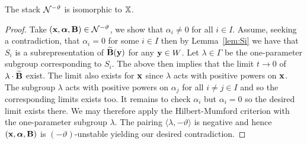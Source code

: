 \documentclass{amsart}
\newcommand{\balpha}{\boldsymbol{\alpha}}
\theoremstyle{definition}
\begin{document}



\begin{corollary}
The stack $\mathcal{N}^{-\vartheta}$ is isomorphic to $\mathbb{X}$.
\end{corollary}

\begin{proof}
Take $(\bfx, \balpha, \bfB) \in \cN^{-\vartheta}$, we show that $\alpha_i \neq 0$ for all $i \in I$.
Assume, seeking a contradiction, that $\alpha_i =0$ for some $i \in I$ then by Lemma~\ref{lem:Si} we have that $S_i$ is a subrepresentation of $\widetilde{\mathbf{B}}(\mathbf{y})$ for any $\mathbf{y} \in W$.
Let $\lambda \in \Gamma$ be the one-parameter subgroup corresponding to $S_i$.
The above then implies that the limit $t \rightarrow 0$ of $\lambda \cdot \widetilde{\mathbf{B}}$ exist.
The limit also exists for $\mathbf{x}$ since $\lambda$ acts with positive powers on $\mathbf{x}$.
The subgroup $\lambda$ acts with positive powers on $\alpha_j$ for all $i\neq j\in I$ and so the corresponding limits exists too.
It remains to check $\alpha_i$ but $\alpha_i=0$ so the desired limit exists there.
We may therefore apply the Hilbert-Mumford criterion with the one-parameter subgroup $\lambda$.
The pairing $\langle \lambda, -\vartheta \rangle$ is negative and hence $(\bfx, \balpha, \bfB)$ is $(-\vartheta)$-unstable yielding our desired contradiction.
\end{proof}
\end{document}
